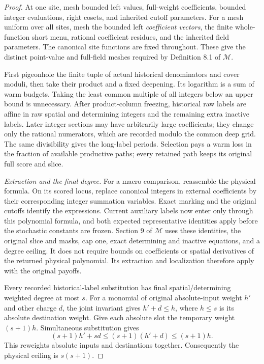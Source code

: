 \documentclass[11pt,a4paper]{article}
\theoremstyle{definition}
\newcommand{\M}{\mathcal M}
\begin{document}
\begin{proof}
At one site, mesh bounded left values, full-weight coefficients,
bounded integer evaluations, right cosets, and inherited cutoff
parameters. For a mesh uniform over all sites, mesh the bounded
left \emph{coefficient vectors}, the finite whole-function short
menu, rational coefficient residues, and the inherited field
parameters. The canonical site functions are fixed throughout.
These give the distinct point-value and full-field meshes required
by Definition 8.1 of \(\M\).

First pigeonhole the finite tuple of actual historical denominators
and cover moduli, then take their product and a fixed deepening.
Its logarithm is a sum of warm budgets. Taking the least common
multiple of all integers below an upper bound is unnecessary.
After product-column freezing, historical raw labels are affine
in raw spatial and determining integers and the remaining extra
inactive labels. Later integer sections may have arbitrarily large coefficients;
they change only the rational numerators, which are recorded
modulo the common deep grid. The same divisibility gives the
long-label periods. Selection pays a warm loss in the fraction of
available productive paths; every retained path keeps its original
full score and slice.

\textit{Extraction and the final degree.}
For a macro comparison, reassemble the physical formula. On its
scored locus, replace canonical integers in external coefficients
by their corresponding integer summation variables. Exact marking
and the original cutoffs identify the expressions. Current
auxiliary labels now enter only through this polynomial formula,
and both expected representative identities apply before the
stochastic constants are frozen. Section 9 of \(\M\) uses these
identities, the original slice and masks, cap one, exact
determining and inactive equations, and a degree ceiling. It
does not require bounds on coefficients or spatial derivatives
of the returned physical polynomial. Its extraction and
localization therefore apply with the original payoffs.

Every recorded historical-label substitution has final
spatial/determining weighted degree at most \(s\). For a monomial
of original absolute-input weight \(h'\) and other charge \(d\),
the joint invariant gives \(h'+d\le h\), where \(h\le s\) is
its absolute destination weight. Give each absolute slot the
temporary weight \((s+1)h\). Simultaneous substitution gives
\begin{equation}\label{eq:quadratic}
 (s+1)h'+sd\le (s+1)(h'+d)\le(s+1)h.
\end{equation}
This reweights absolute inputs and destinations together.
Consequently the physical ceiling is \(s(s+1)\).


\end{proof}
\end{document}
